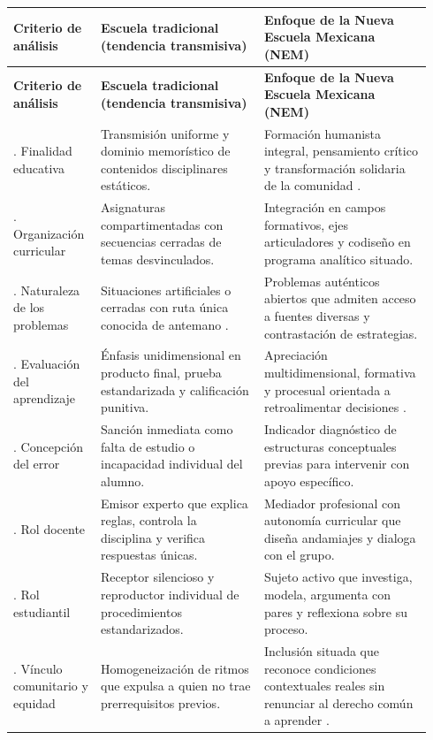 \documentclass[spanish,letterpaper,oneside]{article}
\begin{document}
{\small{}\renewcommand{\arraystretch}{1.3}
\begin{longtable}{|>{\raggedright\arraybackslash}p{0.19\linewidth}|>{\raggedright\arraybackslash}p{0.37\linewidth}|>{\raggedright\arraybackslash}p{0.38\linewidth}|}\hline
\rowcolor{iiiepePale} \textbf{Criterio de análisis} & \textbf{Escuela tradicional (tendencia transmisiva)} & \textbf{Enfoque de la Nueva Escuela Mexicana (NEM)} \\\hline
\endfirsthead
\hline
\rowcolor{iiiepePale} \textbf{Criterio de análisis} & \textbf{Escuela tradicional (tendencia transmisiva)} & \textbf{Enfoque de la Nueva Escuela Mexicana (NEM)} \\\hline
\endhead
1. Finalidad educativa & Transmisión uniforme y dominio memorístico de contenidos disciplinares estáticos. & Formación humanista integral, pensamiento crítico y transformación solidaria de la comunidad \citep{sep2022plan}. \\\hline
2. Organización curricular & Asignaturas compartimentadas con secuencias cerradas de temas desvinculados. & Integración en campos formativos, ejes articuladores y codiseño en programa analítico situado. \\\hline
3. Naturaleza de los problemas & Situaciones artificiales o cerradas con ruta única conocida de antemano \citep{scallon2004evaluation}. & Problemas auténticos abiertos que admiten acceso a fuentes diversas y contrastación de estrategias. \\\hline
4. Evaluación del aprendizaje & Énfasis unidimensional en producto final, prueba estandarizada y calificación punitiva. & Apreciación multidimensional, formativa y procesual orientada a retroalimentar decisiones \citep{scallon2004evaluation}. \\\hline
5. Concepción del error & Sanción inmediata como falta de estudio o incapacidad individual del alumno. & Indicador diagnóstico de estructuras conceptuales previas para intervenir con apoyo específico. \\\hline
6. Rol docente & Emisor experto que explica reglas, controla la disciplina y verifica respuestas únicas. & Mediador profesional con autonomía curricular que diseña andamiajes y dialoga con el grupo. \\\hline
7. Rol estudiantil & Receptor silencioso y reproductor individual de procedimientos estandarizados. & Sujeto activo que investiga, modela, argumenta con pares y reflexiona sobre su proceso. \\\hline
8. Vínculo comunitario y equidad & Homogeneización de ritmos que expulsa a quien no trae prerrequisitos previos. & Inclusión situada que reconoce condiciones contextuales reales sin renunciar al derecho común a aprender \citep{meirieu2020escuela}. \\\hline
\end{longtable}}
\end{document}
